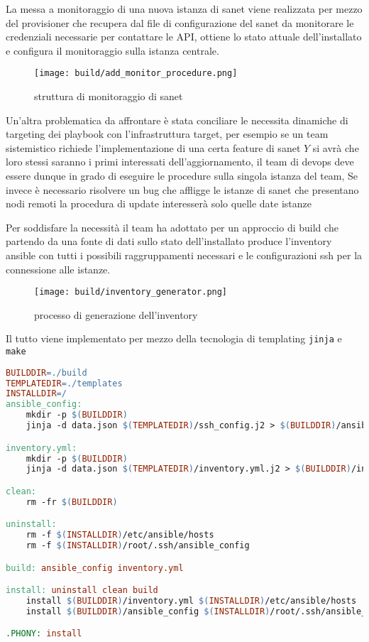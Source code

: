 La messa a monitoraggio di una nuova istanza di sanet viene realizzata per mezzo del provisioner che recupera dal file di configurazione del sanet da monitorare le credenziali necessarie per contattare le API, ottiene lo stato attuale dell'installato e configura il monitoraggio sulla istanza centrale.

\begin{figure}[H]
    \centering
    \texttt{[image: build/add\_monitor\_procedure.png]}
    \caption{struttura di monitoraggio di sanet}
    \label{fig:add_monitor_procedure}
\end{figure}

Un'altra problematica da affrontare è stata conciliare le necessita dinamiche di targeting dei playbook con l'infrastruttura target, per esempio se un team sistemistico richiede l'implementazione di una certa feature di sanet \(Y\) si avrà che loro stessi saranno i primi interessati dell'aggiornamento, il team di devops deve essere dunque in grado di eseguire le procedure sulla singola istanza del team, Se invece è necessario risolvere un bug che affligge le istanze di sanet che presentano nodi remoti la procedura di update interesserà solo quelle date istanze

Per soddisfare la necessità il team ha adottato per un approccio di build che partendo da una fonte di dati sullo stato dell'installato produce l'inventory ansible con tutti i possibili raggruppamenti necessari e le configurazioni ssh per la connessione alle istanze.

\begin{figure}[H]
    \centering
    \texttt{[image: build/inventory\_generator.png]}
    \caption{processo di generazione dell'inventory}
    \label{fig:inventory_generator}
\end{figure}

Il tutto viene implementato per mezzo della tecnologia di templating \verb|jinja| e \verb|make|

\begin{lstlisting}[language=make]
BUILDDIR=./build
TEMPLATEDIR=./templates
INSTALLDIR=/
ansible_config:
	mkdir -p $(BUILDDIR)
	jinja -d data.json $(TEMPLATEDIR)/ssh_config.j2 > $(BUILDDIR)/ansible_config

inventory.yml:
	mkdir -p $(BUILDDIR)
	jinja -d data.json $(TEMPLATEDIR)/inventory.yml.j2 > $(BUILDDIR)/inventory.yml

clean:
	rm -fr $(BUILDDIR)

uninstall:
	rm -f $(INSTALLDIR)/etc/ansible/hosts
	rm -f $(INSTALLDIR)/root/.ssh/ansible_config

build: ansible_config inventory.yml

install: uninstall clean build
	install $(BUILDDIR)/inventory.yml $(INSTALLDIR)/etc/ansible/hosts
	install $(BUILDDIR)/ansible_config $(INSTALLDIR)/root/.ssh/ansible_config

.PHONY: install
\end{lstlisting}
